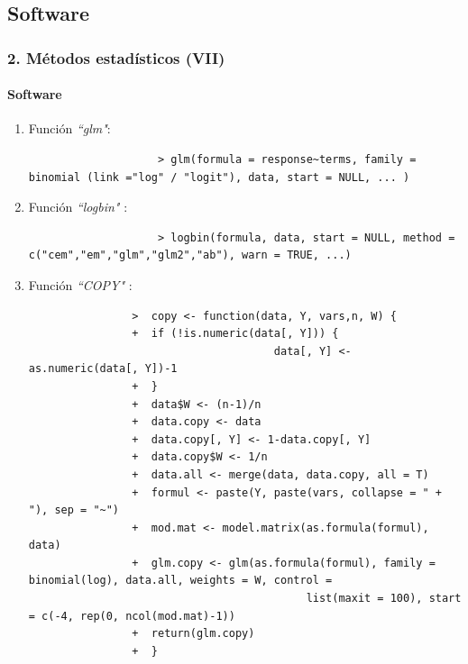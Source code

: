 \documentclass{beamer}
\begin{document}
\subsection{Software}
\begin{frame}[fragile]
\frametitle{2. Métodos estadísticos (VII)}
\framesubtitle{Software}
	\begin{enumerate}
		\vspace{-0.2cm}
		\item Función \textit{``glm"}:
		\vspace{-0.15cm}
			\begin{exampleblock}{}
				\begin{tiny}
					\begin{verbatim}
					> glm(formula = response~terms, family = binomial (link ="log" / "logit"), data, start = NULL, ... )
					\end{verbatim}
				\end{tiny}
			\end{exampleblock}
		\item Función \textit{``logbin"} \autocite{logbinR}:
		\vspace{-0.15cm}
			\begin{exampleblock}{}
				\begin{tiny}
					\begin{verbatim}
					> logbin(formula, data, start = NULL, method = c("cem","em","glm","glm2","ab"), warn = TRUE, ...)
					\end{verbatim}
			\end{tiny}
			\end{exampleblock}
		\item Función \textit{``COPY"} \autocite{COPY}:
		\vspace{-0.15cm}
			\begin{exampleblock}{}
			\begin{tiny}
				\begin{verbatim}
				>  copy <- function(data, Y, vars,n, W) {
				+  if (!is.numeric(data[, Y])) {
								      data[, Y] <- as.numeric(data[, Y])-1
				+  }
				+  data$W <- (n-1)/n
				+  data.copy <- data
				+  data.copy[, Y] <- 1-data.copy[, Y]
				+  data.copy$W <- 1/n
				+  data.all <- merge(data, data.copy, all = T)
				+  formul <- paste(Y, paste(vars, collapse = " + "), sep = "~")
				+  mod.mat <- model.matrix(as.formula(formul), data)
				+  glm.copy <- glm(as.formula(formul), family = binomial(log), data.all, weights = W, control = 
							               list(maxit = 100), start = c(-4, rep(0, ncol(mod.mat)-1))
				+  return(glm.copy)
				+  }
				\end{verbatim}
			\end{tiny}
		\end{exampleblock}
	\end{enumerate}
\end{frame}
\end{document}
